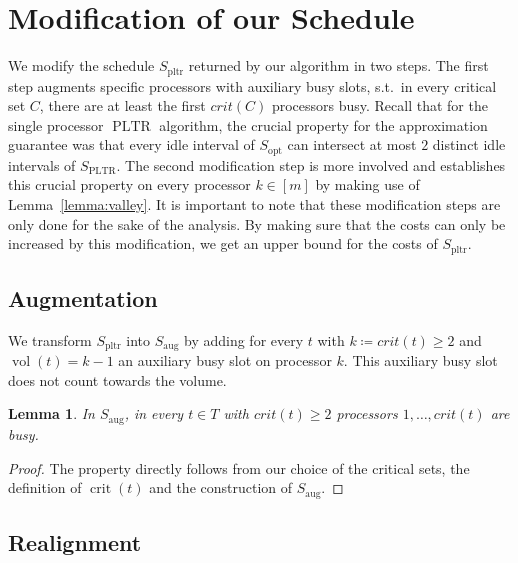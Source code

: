 \documentclass[a4paper]{article}
\DeclareMathOperator{\opt}{opt}
\DeclareMathOperator{\pltr}{pltr}
\DeclareMathOperator{\ltr}{PLTR}
\DeclareMathOperator{\aug}{aug}
\DeclareMathOperator{\vol}{vol}
\DeclareMathOperator{\crit}{crit}
\newtheorem{lemma}[theorem]{Lemma}
\begin{document}
\section{Modification of our Schedule}
We modify the schedule $S_{\pltr}$ returned by our algorithm in two steps.
The first step augments specific processors with auxiliary busy slots, s.t.\ in every critical set $C$, there are at least the first $crit(C)$ processors busy.
Recall that for the single processor $\ltr$ algorithm, the crucial property for the approximation guarantee was that every idle interval of $S_{\opt}$ can intersect at most $2$ distinct idle intervals of $S_{\ltr}$.
The second modification step is more involved and establishes this crucial property on every processor $k \in [m]$ by making use of Lemma~\ref{lemma:valley}.
It is important to note that these modification steps are only done for the sake of the analysis.
By making sure that the costs can only be increased by this modification, we get an upper bound for the costs of $S_{\pltr}$.

\subsection{Augmentation}
We transform $S_{\pltr}$ into $S_{\aug}$ by adding for every $t$ with $k \coloneqq crit(t) \geq 2$ and $\vol(t) = k-1$ an auxiliary busy slot on processor $k$.
This auxiliary busy slot does not count towards the volume.

\begin{lemma}\label{lemma:augmented}
  In $S_{\aug}$, in every $t \in T$ with $crit(t) \geq 2$ processors $1, \ldots, crit(t)$ are busy.
\end{lemma}
\begin{proof}
  The property directly follows from our choice of the critical sets, the definition of $\crit(t)$ and the construction of $S_{\aug}$.
\end{proof}

\subsection{Realignment}
\end{document}
